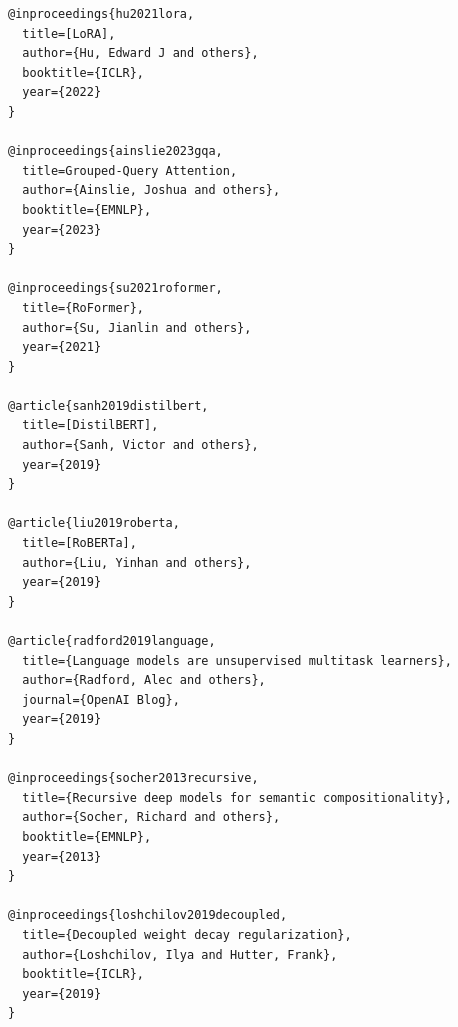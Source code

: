 \begin{lstlisting}
@inproceedings{hu2021lora,
  title=[LoRA],
  author={Hu, Edward J and others},
  booktitle={ICLR},
  year={2022}
}

@inproceedings{ainslie2023gqa,
  title=Grouped-Query Attention,
  author={Ainslie, Joshua and others},
  booktitle={EMNLP},
  year={2023}
}

@inproceedings{su2021roformer,
  title={RoFormer},
  author={Su, Jianlin and others},
  year={2021}
}

@article{sanh2019distilbert,
  title=[DistilBERT],
  author={Sanh, Victor and others},
  year={2019}
}

@article{liu2019roberta,
  title=[RoBERTa],
  author={Liu, Yinhan and others},
  year={2019}
}

@article{radford2019language,
  title={Language models are unsupervised multitask learners},
  author={Radford, Alec and others},
  journal={OpenAI Blog},
  year={2019}
}

@inproceedings{socher2013recursive,
  title={Recursive deep models for semantic compositionality},
  author={Socher, Richard and others},
  booktitle={EMNLP},
  year={2013}
}

@inproceedings{loshchilov2019decoupled,
  title={Decoupled weight decay regularization},
  author={Loshchilov, Ilya and Hutter, Frank},
  booktitle={ICLR},
  year={2019}
}
\end{lstlisting}

